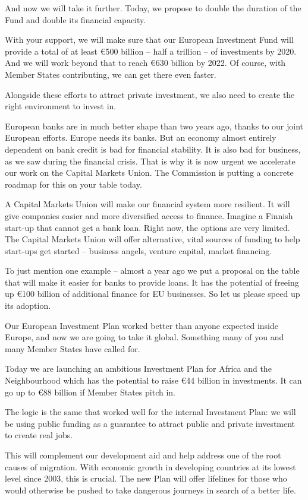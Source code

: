 \documentclass[a4paper,11pt]{article}
\begin{document}
And now we will take it further. Today, we propose to double the duration of the Fund and double its financial capacity.

With your support, we will make sure that our European Investment Fund will provide a total of at least \euro500 billion – half a trillion – of investments by 2020. And we will work beyond that to reach \euro630 billion by 2022. Of course, with Member States contributing, we can get there even faster.

Alongside these efforts to attract private investment, we also need to create the right environment to invest in.

European banks are in much better shape than two years ago, thanks to our joint European efforts. Europe needs its banks. But an economy almost entirely dependent on bank credit is bad for financial stability. It is also bad for business, as we saw during the financial crisis. That is why it is now urgent we accelerate our work on the Capital Markets Union. The Commission is putting a concrete roadmap for this on your table today.

A Capital Markets Union will make our financial system more resilient. It will give companies easier and more diversified access to finance. Imagine a Finnish start-up that cannot get a bank loan. Right now, the options are very limited. The Capital Markets Union will offer alternative, vital sources of funding to help start-ups get started – business angels, venture capital, market financing.

To just mention one example – almost a year ago we put a proposal on the table that will make it easier for banks to provide loans. It has the potential of freeing up \euro100 billion of additional finance for EU businesses. So let us please speed up its adoption.

Our European Investment Plan worked better than anyone expected inside Europe, and now we are going to take it global. Something many of you and many Member States have called for.

Today we are launching an ambitious Investment Plan for Africa and the Neighbourhood which has the potential to raise \euro44 billion in investments. It can go up to \euro88 billion if Member States pitch in.

The logic is the same that worked well for the internal Investment Plan: we will be using public funding as a guarantee to attract public and private investment to create real jobs.

This will complement our development aid and help address one of the root causes of migration. With economic growth in developing countries at its lowest level since 2003, this is crucial. The new Plan will offer lifelines for those who would otherwise be pushed to take dangerous journeys in search of a better life.
\end{document}
